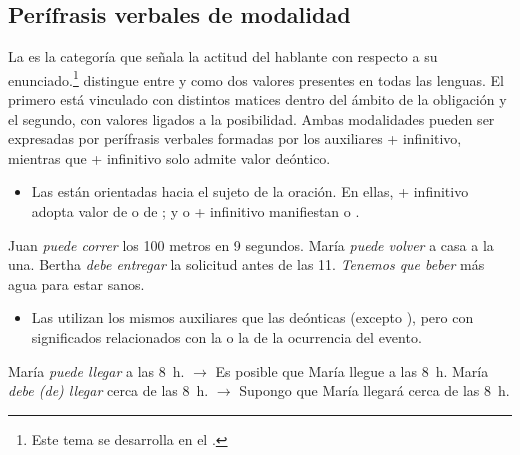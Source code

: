 \subsection{Perífrasis verbales de modalidad}\label{sec:11-modales}

La  es la categoría que señala la actitud del hablante con
respecto a su enunciado.\footnote{Este tema se desarrolla en el
.}
\textcite{palmer1986} distingue entre  y
 como dos valores presentes en todas las lenguas.
El primero está vinculado con distintos matices dentro del ámbito de la
obligación y el segundo, con valores ligados a la posibilidad. Ambas modalidades
pueden ser expresadas por perífrasis verbales formadas por los auxiliares
 + infinitivo, mientras que  +
infinitivo solo admite valor deóntico.

\begin{itemize}
  \item Las  están orientadas hacia el sujeto de la
        oración. En ellas,  + infinitivo adopta valor de
          o de 
        ; y  o  +
        infinitivo manifiestan   o
         .
\end{itemize}

\begin{exe}
  \ex\label{ex:11-correr} Juan \textit{puede correr} los 100 metros en 9
      segundos.
  \ex\label{ex:11-volver} María \textit{puede volver} a casa a la una.
  \ex\label{ex:11-bertha} Bertha \textit{debe entregar} la solicitud antes de las
      11.
  \ex\label{ex:11-agua} \textit{Tenemos que beber} más agua para estar sanos.
\end{exe}

\begin{itemize}
  \item Las  utilizan los mismos auxiliares que
        las deónticas (excepto ), pero con significados
        relacionados con la  o la  de la
        ocurrencia del evento.
\end{itemize}

\begin{exe}
  \ex María \textit{puede llegar} a las 8~h. $\rightarrow$ Es posible que María
      llegue a las 8~h.
  \ex María \textit{debe (de) llegar} cerca de las 8~h. $\rightarrow$ Supongo que
      María llegará cerca de las 8~h.
\end{exe}

